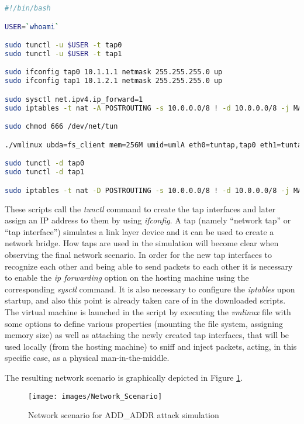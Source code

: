 \begin{lstlisting}[language=bash, caption=\textit{client.sh} to start the client UML, label=clientconf]
#!/bin/bash

USER=`whoami`

sudo tunctl -u $USER -t tap0
sudo tunctl -u $USER -t tap1

sudo ifconfig tap0 10.1.1.1 netmask 255.255.255.0 up
sudo ifconfig tap1 10.1.2.1 netmask 255.255.255.0 up

sudo sysctl net.ipv4.ip_forward=1
sudo iptables -t nat -A POSTROUTING -s 10.0.0.0/8 ! -d 10.0.0.0/8 -j MASQUERADE

sudo chmod 666 /dev/net/tun

./vmlinux ubda=fs_client mem=256M umid=umlA eth0=tuntap,tap0 eth1=tuntap,tap1

sudo tunctl -d tap0
sudo tunctl -d tap1

sudo iptables -t nat -D POSTROUTING -s 10.0.0.0/8 ! -d 10.0.0.0/8 -j MASQUERADE
\end{lstlisting}

These scripts call the \textit{tunctl} command to create the tap interfaces and later assign an IP address to them by using \textit{ifconfig}. A tap (namely ``network tap'' or ``tap interface'') simulates a link layer device and it can be used to create a network bridge. How taps are used in the simulation will become clear when observing the final network scenario.
In order for the new tap interfaces to recognize each other and being able to send packets to each other it is necessary to enable the \textit{ip forwarding} option on the hosting machine using the corresponding \textit{sysctl} command. It is also necessary to configure the \textit{iptables} upon startup, and also this point is already taken care of in the downloaded scripts. The virtual machine is launched in the script by executing the \textit{vmlinux} file with some options to define various properties (mounting the file system, assigning memory size) as well as attaching the newly created tap interfaces, that will be used locally (from the hosting machine) to sniff and inject packets, acting, in this specific case, as a physical man-in-the-middle.

The resulting network scenario is graphically depicted in Figure \ref{fig:networkscenario}.

\begin{figure}[!htb]
\centering
\texttt{[image: images/Network\_Scenario]}
\caption{Network scenario for ADD\_ADDR attack simulation}
\label{fig:networkscenario}
\end{figure}

